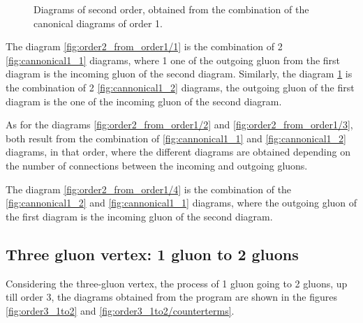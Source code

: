 \documentclass[11pt,a4paper,twoside,pdf]{article}
\numberwithin{equation}{section}
\begin{document}
\begin{figure}[h!]
\begin{subfigure}[t]{0.19\textwidth}
        \caption{ }
        \label{fig:order2_from_order1/5}
    \end{subfigure}
    \caption{Diagrams of second order, obtained from the combination of the canonical
diagrams of order 1.}
    \label{fig:order2_from_order1}
\end{figure}

The diagram \ref{fig:order2_from_order1/1} is the combination of 2 
\ref{fig:cannonical1_1} diagrams, where 1 one of the outgoing gluon from the first
diagram is the incoming gluon of the second diagram. Similarly, the diagram
\ref{fig:order2_from_order1/5} is the combination of 2 \ref{fig:cannonical1_2} diagrams, 
the outgoing gluon of the first diagram is the one of the incoming gluon of the 
second diagram.

As for the diagrams \ref{fig:order2_from_order1/2} and \ref{fig:order2_from_order1/3}, 
both result from the combination of \ref{fig:cannonical1_1} and \ref{fig:cannonical1_2} diagrams,
in that order, where the different diagrams are obtained depending on the number of
connections between the incoming and outgoing gluons.

The diagram \ref{fig:order2_from_order1/4} is the combination of the
\ref{fig:cannonical1_2} and \ref{fig:cannonical1_1} diagrams, where the outgoing gluon
of the first diagram is the incoming gluon of the second diagram.



\subsection{Three gluon vertex: 1 gluon to 2 gluons}

Considering the three-gluon vertex, the process of 1 gluon going to 2 gluons, up till 
order 3, the diagrams obtained from the program are shown in the figures 
\ref{fig:order3_1to2} and \ref{fig:order3_1to2/counterterms}.
\end{document}
